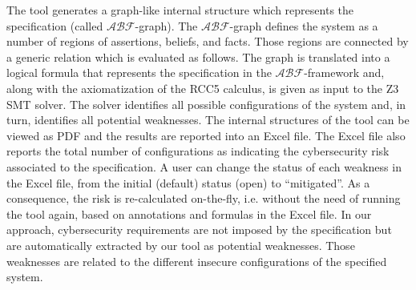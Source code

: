 \documentclass[conference]{IEEEtran}
\newcommand{\assertionRegion}{\mathcal{A}}
\newcommand{\beliefRegion}{\mathcal{B}}
\newcommand{\factRegion}{\mathcal{F}}
\newcommand{\abftheory}{\assertionRegion\beliefRegion\factRegion}
\begin{document}
The tool generates a graph-like internal structure which represents
the specification (called $\abftheory$-graph). The $\abftheory$-graph defines the system as
a number of regions of assertions, beliefs, and facts. Those regions
are connected by a generic relation which is evaluated as follows.
The graph is translated into 
a logical formula that represents the specification in the $\abftheory$-framework and,
along with the axiomatization of the RCC5 calculus, is given as input to the Z3 SMT solver.
The solver identifies all possible configurations of the system and, in turn,
identifies all potential weaknesses. 
The internal structures of the tool
can be viewed as PDF and the results are reported into an Excel file.
The Excel file also reports the total number of configurations as indicating
the cybersecurity risk associated to the specification. A user can change the status
of each weakness in the Excel file, from the initial (default) status (open)
to ``mitigated''. As a consequence, the risk is re-calculated on-the-fly, i.e.
without the need of running the tool again, based on annotations and formulas 
in the Excel file.
In our approach, cybersecurity requirements are not imposed by the
specification but are automatically extracted by our tool as potential weaknesses.
Those weaknesses are related to the different insecure configurations 
of the specified system. 
\end{document}
